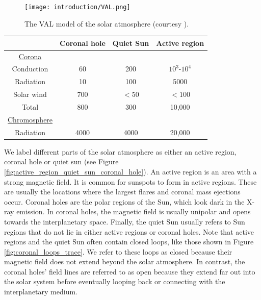 \begin{figure}[!htp]
    \centering
    \texttt{[image: introduction/VAL.png]}
    \caption{The VAL model \citep{Vernazza1981} of the solar atmosphere (courtesy \citet{Williams2018}).}
    \label{fig:VAL_atmosphere}
\end{figure}

\begin{table}[!htp]
    \centering
    \begin{tabular}{c c c c}
        \hline
         & Coronal hole & Quiet Sun & Active region \\
        \hline
        \underline{Corona}  \\
        Conduction & 60 & 200 & $10^3\text{-}10^4$ \\
        Radiation & 10 & 100 & 5000 \\
        Solar wind & 700 & $<50$ & $<100$ \\
        \hline
        Total & 800 & 300 & 10,000 \\
        \hline
        \underline{Chromosphere} \\
        Radiation & 4000 & 4000 & 20,000
        
    \end{tabular}
    \label{tab:energy_losses_corona_chromosphere}
\end{table}

We label different parts of the solar atmosphere as either an active region, coronal hole or quiet sun (see Figure \ref{fig:active_region_quiet_sun_coronal_hole}). An active region is an area with a strong magnetic field. It is common for sunspots to form in active regions. These are usually the locations where the largest flares and coronal mass ejections occur. Coronal holes are the polar regions of the Sun, which look dark in the X-ray emission. In coronal holes, the magnetic field is usually unipolar and opens towards the interplanetary space. Finally, the quiet Sun usually refers to Sun regions that do not lie in either active regions or coronal holes. Note that active regions and the quiet Sun often contain closed loops, like those shown in Figure \ref{fig:coronal_loops_trace}. We refer to these loops as closed because their magnetic field does not extend beyond the solar atmosphere. In contrast, the coronal holes' field lines are referred to as open because they extend far out into the solar system before eventually looping back or connecting with the interplanetary medium.

